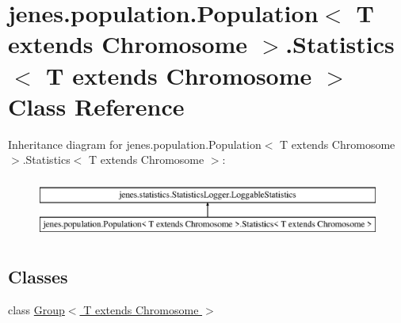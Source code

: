 \hypertarget{classjenes_1_1population_1_1_population_3_01_t_01extends_01_chromosome_01_4_1_1_statistics_3_01_t_01extends_01_chromosome_01_4}{\section{jenes.\-population.\-Population$<$ T extends Chromosome $>$.Statistics$<$ T extends Chromosome $>$ Class Reference}
\label{classjenes_1_1population_1_1_population_3_01_t_01extends_01_chromosome_01_4_1_1_statistics_3_01_t_01extends_01_chromosome_01_4}
}
Inheritance diagram for jenes.\-population.\-Population$<$ T extends Chromosome $>$.Statistics$<$ T extends Chromosome $>$\-:\begin{figure}[H]
\begin{center}
\leavevmode
\includegraphics[height=2.000000cm]{classjenes_1_1population_1_1_population_3_01_t_01extends_01_chromosome_01_4_1_1_statistics_3_01_t_01extends_01_chromosome_01_4}
\end{center}
\end{figure}
\subsection*{Classes}
\begin{DoxyCompactItemize}
\item 
class \hyperlink{classjenes_1_1population_1_1_population_3_01_t_01extends_01_chromosome_01_4_1_1_statistics_3_01_f7597188e8ce49bb3794d06ba6cb2ae1}{Group$<$ T extends Chromosome $>$}
\end{DoxyCompactItemize}
